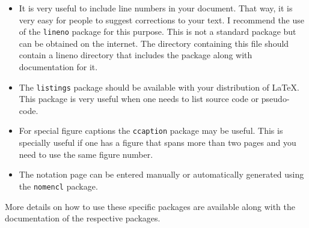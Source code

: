 \begin{itemize}  
\item It is very useful to include line numbers in your document.
  That way, it is very easy for people to suggest corrections to your
  text.  I recommend the use of the \texttt{lineno} package for this
  purpose.  This is not a standard package but can be obtained on the
  internet.  The directory containing this file should contain a
  lineno directory that includes the package along with documentation
  for it.

\item The \texttt{listings} package should be available with your
  distribution of \LaTeX.  This package is very useful when one needs
  to list source code or pseudo-code.

\item For special figure captions the \texttt{ccaption} package may be
  useful.  This is specially useful if one has a figure that spans
  more than two pages and you need to use the same figure number.

\item The notation page can be entered manually or automatically
  generated using the \texttt{nomencl} package.

\end{itemize}

More details on how to use these specific packages are available along
with the documentation of the respective packages.
